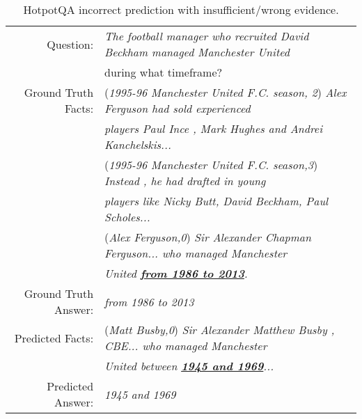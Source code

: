 \documentclass[11pt,a4paper]{article}
\begin{document}
\begin{table*}[t]
\centering
\small
\begin{tabular}{rl}
\toprule
Question: & \textit{The football manager who recruited David Beckham managed Manchester United} \\
& during what timeframe?\\
\midrule

Ground Truth Facts: & (\textit{1995-96 Manchester United F.C. season, 2}) \textit{Alex Ferguson had sold experienced}\\ 
& \textit{players Paul Ince , Mark Hughes and Andrei Kanchelskis...}\\
 & (\textit{1995-96 Manchester United F.C. season,3}) \textit{Instead , he had drafted in young}\\
 & \textit{players like Nicky Butt, David Beckham, Paul Scholes...}\\
 & (\textit{Alex Ferguson,0}) \textit{Sir Alexander Chapman Ferguson... who managed Manchester }\\
& \textit{United \underline{\textbf{from 1986 to 2013}}.}\\
Ground Truth Answer: & \textit{from 1986 to 2013}\\
\midrule
Predicted Facts: & (\textit{Matt Busby,0}) \textit{Sir Alexander Matthew Busby , CBE... who managed Manchester}\\ & \textit{United between \underline{\textbf{{}1945 and 1969}}...}\\

Predicted Answer: & \textit{1945 and 1969}\\
\bottomrule
\end{tabular}
\caption{HotpotQA incorrect prediction with insufficient/wrong evidence.}
\label{table:ranker_analysis_1}
\end{table*}
\end{document}
